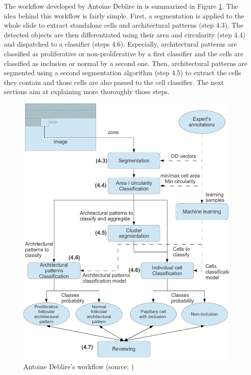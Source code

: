 The workflow developed by Antoine Deblire in \cite{adeblire2013} is summarized in Figure \ref{fig:workflow_adeblire}. The idea behind this workflow is fairly simple. First, a segmentation is applied to the whole slide to extract standalone cells and architectural patterns (step 4.3). The detected objects are then differentiated using their area and circularity (step 4.4) and dispatched to a classifier (steps 4.6). Especially, architectural patterns are classified as proliferative or non-proliferative by a first classifier and the cells are classified as inclusion or normal by a second one. Then, architectural patterns are segmented using a second segmentation algorithm (step 4.5) to extract the cells they contain and those cells are also passed to the cell classifier. The next sections aim at explaining more thoroughly those steps.

\begin{figure}
	\center
	\includegraphics[scale=0.95]{image/adeblire_workflow.png}
	\caption{Antoine Deblire's workflow (source: \cite{adeblire2013})}
	\label{fig:workflow_adeblire}
\end{figure}

